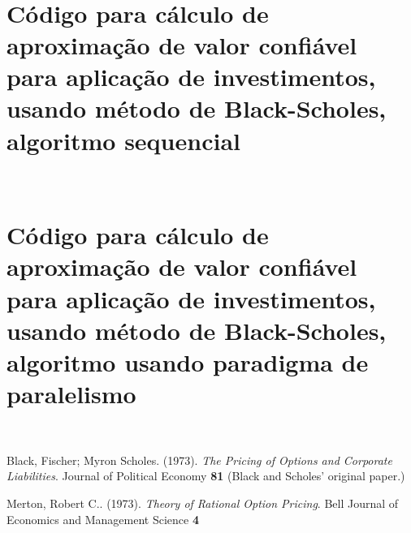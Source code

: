 \documentclass[11pt,twoside]{article}
\begin{document}
\begin{appendices}
    \ \\
        
    \chapter{Código para cálculo de aproximação de valor confiável para aplicação de investimentos, usando método de Black-Scholes, algoritmo sequencial}
        
        
    \ \\
        
    \chapter{Código para cálculo de aproximação de valor confiável para aplicação de investimentos, usando método de Black-Scholes, algoritmo usando paradigma de paralelismo}
        
        
    \ \\

\end{appendices}

\clearpage

\begin{thebibliography}{99}

     Black, Fischer; Myron Scholes. (1973). {\it The Pricing of Options and Corporate Liabilities}. Journal of Political Economy {\bf 81} (Black and Scholes' original paper.)
    
     Merton, Robert C.. (1973). {\it Theory of Rational Option Pricing}. Bell Journal of Economics and Management Science {\bf 4}

\end{thebibliography}
\end{document}
